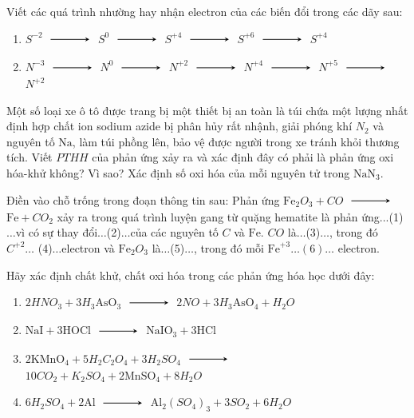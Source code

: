	\begin{bt}
		Viết các quá trình nhường hay nhận electron của các biến đổi trong các dãy sau:
		\begin{enumerate}
			\item $S^{-2} $ $\xrightarrow$ $ S^0$ $\xrightarrow$ $ S^{+4} $ $\xrightarrow$ $ S^{+6} $ $\xrightarrow$ $ S^{+4}$
			\item $N^{-3} $ $\xrightarrow$ $ N^0$ $\xrightarrow$ $ N^{+2} $ $\xrightarrow$ $ N^{+4} $ $\xrightarrow$ $ N^{+5} $ $\xrightarrow$ $ N^{+2}$
		\end{enumerate}
		\loigiai{}
	\end{bt}
	\begin{bt}
		Một số loại xe ô tô được trang bị một thiết bị an toàn là túi chứa một lượng nhất định hợp chất ion sodium azide bị phân hủy rất nhậnh, giải phóng khí $N_2$ và nguyên tố $\mathrm{Na}$, làm túi phồng lên, bảo vệ được người trong xe tránh khỏi thương tích. Viết $PTHH$ của phản ứng xảy ra và xác định đây có phải là phản ứng oxi hóa-khử không? Vì sao? Xác định số oxi hóa của mỗi nguyên tử trong $\mathrm{NaN}_3$.
		\loigiai{}
	\end{bt}
	\begin{bt}
		Điền vào chỗ trống trong đoạn thông tin sau:
		Phản ứng $\mathrm{Fe}_2O_3+CO $ $\xrightarrow$ $ \mathrm{Fe}+CO_2$ xảy ra trong quá trình luyện gang từ quặng hematite là phản ứng...(1)$\ldots$vì có sự thay đổi$\ldots$(2)$\ldots$của các nguyên tố $C$ và $\mathrm{Fe}$. $CO$ là$\ldots$(3)$\ldots$, trong đó $C^{+2} \ldots$ (4)$\ldots$electron và $\mathrm{Fe}_2O_3$ là$\ldots$(5)$\ldots$, trong đó mỗi $\mathrm{Fe}^{+3} \ldots(6) \ldots$ electron.
		\loigiai{}
	\end{bt}
	\begin{bt}[]
		[][]
		Hãy xác định chất khử, chất oxi hóa trong các phản ứng hóa học dưới đây:
		\begin{enumerate}
			\item $2HNO_3+3H_3\mathrm{AsO}_3$ $\xrightarrow$ $ 2NO+3H_3\mathrm{AsO}_4+H_2O$
			\item $\mathrm{NaI}+3\mathrm{HOCl} $ $\xrightarrow$ $ \mathrm{NaIO}_3+3\mathrm{HCl}$
			\item $2\mathrm{KMnO}_4+5H_2C_2O_4+3H_2SO_4$ $\xrightarrow$ $ 10CO_2+K_2SO_4+2\mathrm{MnSO}_4+8H_2O$
			\item $6H_2SO_4+2\mathrm{Al} $ $\xrightarrow$ $ \mathrm{Al}_2\left(SO_4\right)_3+3SO_2+6H_2O$
		\end{enumerate}
		\loigiai{}
	\end{bt}
